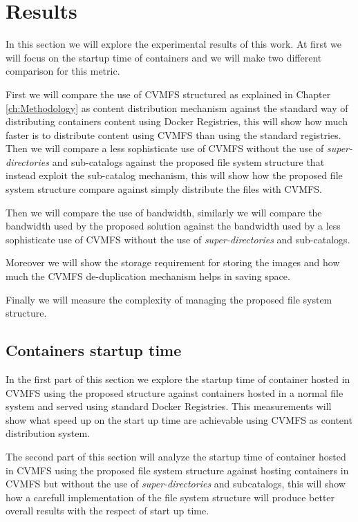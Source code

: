 \chapter{Results}\label{ch:Results}

In this section we will explore the experimental results of this work. At first
we will focus on the startup time of containers and we will make two different
comparison for this metric. 

First we will compare the use of CVMFS structured as explained in Chapter
\ref{ch:Methodology} as content distribution mechanism against the standard way
of distributing containers content using Docker Registries, this will show how
much faster is to distribute content using CVMFS than using the standard
registries.  Then we will compare a less sophisticate use of CVMFS without the
use of \textit{super-directories} and sub-catalogs against the proposed file
system structure that instead exploit the sub-catalog mechanism, this will show
how the proposed file system structure compare against simply distribute the
files with CVMFS.

Then we will compare the use of bandwidth, similarly we will compare the
bandwidth used by the proposed solution against the bandwidth used by a less
sophisticate use of CVMFS without the use of \textit{super-directories} and
sub-catalogs.

Moreover we will show the storage requirement for storing the images and how
much the CVMFS de-duplication mechanism helps in saving space.

Finally we will measure the complexity of managing the proposed file system
structure.

\section{Containers startup time}

In the first part of this section we explore the startup time of container
hosted in CVMFS using the proposed structure against containers hosted in a
normal file system and served using standard Docker Registries. This
measurements will show what speed up on the start up time are achievable using
CVMFS as content distribution system. 

The second part of this section will analyze the startup time of container
hosted in CVMFS using the proposed file system structure against hosting
containers in CVMFS but without the use of \textit{super-directories} and
subcatalogs, this will show how a carefull implementation of the file system
structure will produce better overall results with the respect of start up time.

